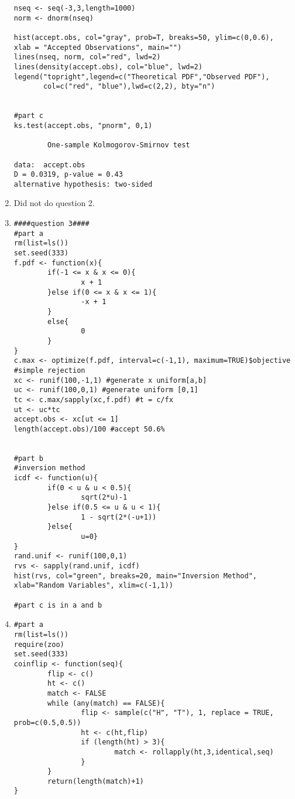 \documentclass[letterpaper]{article}
\begin{document}
\begin{enumerate}
\begin{verbatim}
nseq <- seq(-3,3,length=1000)
norm <- dnorm(nseq)

hist(accept.obs, col="gray", prob=T, breaks=50, ylim=c(0,0.6), 
xlab = "Accepted Observations", main="")
lines(nseq, norm, col="red", lwd=2)
lines(density(accept.obs), col="blue", lwd=2)
legend("topright",legend=c("Theoretical PDF","Observed PDF"),
       col=c("red", "blue"),lwd=c(2,2), bty="n")
       

#part c
ks.test(accept.obs, "pnorm", 0,1)

        One-sample Kolmogorov-Smirnov test

data:  accept.obs
D = 0.0319, p-value = 0.43
alternative hypothesis: two-sided
\end{verbatim}

\item Did not do question 2.
\item 
\begin{verbatim}
####question 3####
#part a
rm(list=ls())
set.seed(333)
f.pdf <- function(x){
        if(-1 <= x & x <= 0){
                x + 1
        }else if(0 <= x & x <= 1){
                -x + 1
        }
        else{
                0
        }
}
c.max <- optimize(f.pdf, interval=c(-1,1), maximum=TRUE)$objective
#simple rejection
xc <- runif(100,-1,1) #generate x uniform[a,b]
uc <- runif(100,0,1) #generate uniform [0,1]
tc <- c.max/sapply(xc,f.pdf) #t = c/fx
ut <- uc*tc
accept.obs <- xc[ut <= 1]
length(accept.obs)/100 #accept 50.6%


#part b
#inversion method
icdf <- function(u){   
        if(0 < u & u < 0.5){
                sqrt(2*u)-1
        }else if(0.5 <= u & u < 1){
                1 - sqrt(2*(-u+1))
        }else{
                u=0}
}
rand.unif <- runif(100,0,1)
rvs <- sapply(rand.unif, icdf)
hist(rvs, col="green", breaks=20, main="Inversion Method", xlab="Random Variables", xlim=c(-1,1))

#part c is in a and b
\end{verbatim}
\item 
\begin{verbatim}
#part a
rm(list=ls())
require(zoo)
set.seed(333)
coinflip <- function(seq){
        flip <- c()
        ht <- c()
        match <- FALSE
        while (any(match) == FALSE){
                flip <- sample(c("H", "T"), 1, replace = TRUE, prob=c(0.5,0.5))
                ht <- c(ht,flip)
                if (length(ht) > 3){
                        match <- rollapply(ht,3,identical,seq)
                }
        }
        return(length(match)+1)
}


\end{verbatim}
\end{enumerate}
\end{document}

